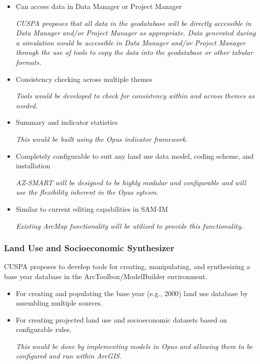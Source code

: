 \documentclass[titlepage]{article}
\begin{document}
\begin{itemize}
\item Can access data in Data Manager or Project Manager

\emph{CUSPA proposes that all data in the geodatabase will be directly accessible in Data Manager and/or Project Manager as appropriate.  Data generated during a simulation would be accessible in Data Manager and/or Project Manager through the use of tools to copy the data into the geodatabase or other tabular formats.}

\item Consistency checking across multiple themes

\emph{Tools would be developed to check for consistency within and across themes as needed.}

\item Summary and indicator statistics

\emph{This would be built using the Opus indicator framework.}

\item Completely configurable to suit any land use data model, coding scheme, and installation

\emph{AZ-SMART will be designed to be highly modular and configurable and will use the flexibility inherent in the Opus sytesm.}

\item Similar to current editing capabilities in SAM-IM

\emph{Existing ArcMap functionality will be utilized to provide this functionality.}

\end{itemize}

\subsubsection{Land Use and Socioeconomic Synthesizer}

CUSPA proposes to develop tools for creating, manipulating, and synthesizing a base year database in the ArcToolbox/ModelBuilder environment.

\begin{itemize}

\item For creating and populating the base year (e.g., 2000) land use database by assembling multiple sources.

\item For creating projected land use and socioeconomic datasets based on configurable rules.

\emph{This would be done by implementing models in Opus and allowing them to be configured and run within ArcGIS. }

\end{itemize}
\end{document}
